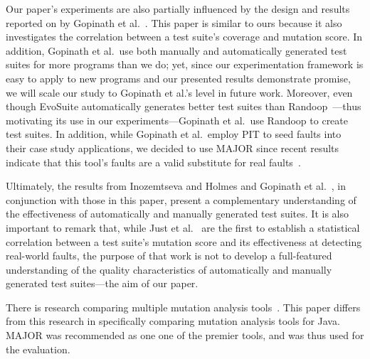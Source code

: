 Our paper's experiments are also partially influenced by the design and results reported on by Gopinath et
al.~\cite{gopinath2014}.  This paper is similar to ours because it also investigates the correlation between a test
suite's coverage and mutation score.  In addition, Gopinath et al.\ use both manually and automatically generated test
suites for more programs than we do; yet, since our experimentation framework is easy to apply to new programs and our
presented results demonstrate promise, we will scale our study to Gopinath et al.'s level in future work. Moreover, even
though EvoSuite automatically generates better test suites than Randoop~\cite{fraser2013a}---thus motivating its use in
our experiments---Gopinath et al.\ use Randoop to create test suites.  In addition, while Gopinath et al.\ employ PIT to
seed faults into their case study applications, we decided to use MAJOR since recent results indicate that this tool's
faults are a valid substitute for real faults~\cite{just2014}. 

Ultimately, the results from Inozemtseva and Holmes \cite{inozemtseva2014} and Gopinath et al.~\cite{gopinath2014}, in
conjunction with those in this paper, present a complementary understanding of the effectiveness of automatically and
manually generated test suites. It is also important to remark that, while Just et al.~\cite{just2014} are the first to
establish a statistical correlation between a test suite's mutation score and its effectiveness at detecting real-world
faults, the purpose of that work is not to develop a full-featured understanding of the quality characteristics of
automatically and manually generated test suites---the aim of our paper.



There is research comparing multiple mutation analysis tools~\cite{ComparingAutomatedMutationTools:2013}. This paper differs from this research in specifically comparing mutation analysis tools for Java. MAJOR was recommended as one one of the premier tools, and was thus used for the evaluation.
